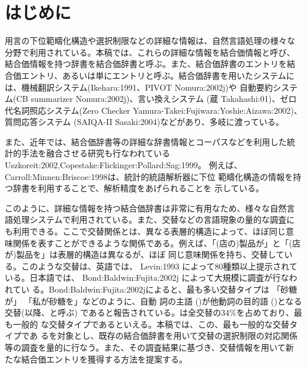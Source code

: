 \documentclass[japanese]{jnlp}
\newcommand{\sbj}{}
\newcommand{\obj}{}
\newcommand{\ul}[1]{}
\newcommand{\soalt}{}
\newcommand{\citep}{}
\newcommand{\citet}{}
\newcommand{\altje}{}
\def\smpt#1{}
\renewcommand{\smpt}[1]{}
\newcommand{\tot}{}
\begin{document}




\maketitle


\section{はじめに}\label{sec:introduction}

\smpt{結合価辞書の重要性}

用言の下位範疇化構造や選択制限などの詳細な情報は、自然言語処理の様々な
分野で利用されている。本稿では、これらの詳細な情報を結合価情報と呼び、
結合価情報を持つ辞書を結合価辞書と呼ぶ。また、結合価辞書のエントリを結
合価エントリ、あるいは単にエントリと呼ぶ。結合価辞書を用いたシステムに
は、機械翻訳システム(\altje \citep{Ikehara:1991}、PIVOT
\citep{Nomura:2002j})や
自動要約システム(CB summarizer \citep{Nomura:2002j})、言い換えシステム
(蔵 \citep{Takahashi:01})、ゼロ代名詞照応システム(Zero Checker
\citep{Yamura-Takei:Fujiwara:Yoshie:Aizawa:2002})、質問応答システム
(SAIQA-II \citep{Sasaki:2004})などがあり、多岐に渡っている。


また、近年では、結合価辞書等の詳細な辞書情報とコーパスなどを利用した統
計的手法を融合させる研究も行なわれている
\citep{Uszkoreit:2002,Copestake:Flickinger:Pollard:Sag:1999}。
例えば、\citet{Carroll:Minnen:Briscoe:1998}は、統計的統語解析器に下位
範疇化構造の情報を持つ辞書を利用することで、解析精度をあげられることを
示している。


\smpt{言語現象を調べることに利用できる}

このように、詳細な情報を持つ結合価辞書は非常に有用なため、様々な自然言
語処理システムで利用されている。また、交替などの言語現象の量的な調査に
も利用できる。ここで交替関係とは、異なる表層的構造によって、ほぼ同じ意
味関係を表すことができるような関係である。例えば、「(店の)製品が\ul{完
  売する}」と「(店が)製品を\ul{完売する}」は表層的構造は異なるが、ほぼ
同じ意味関係を持ち、交替している。このような交替は、英語では、
\citet{Levin:1993} によって80種類以上提示されている。日本語では、
\citet{Bond:Baldwin:Fujita:2002j}  によって大規模に調査が行なわれてい
る。\citet{Bond:Baldwin:Fujita:2002j}によると、最も多い交替タイプは
「砂糖が\ul{溶ける}」 \tot 「私が砂糖を\ul {溶く}」などのように、自動
詞の主語 (\sbj)が他動詞の目的語 (\obj)となる交替(以降、\soalt と呼ぶ)
であると報告されている。\soalt は全交替の34\%を占めており、最も一般的
な交替タイプであるといえる。本稿では、この、最も一般的な交替タイプであ
る\soalt を対象とし、既存の結合価辞書を用いて交替の選択制限の対応関係
等の調査を量的に行なう。また、その調査結果に基づき、交替情報を用いて新
たな結合価エントリを獲得する方法を提案する。
\end{document}
